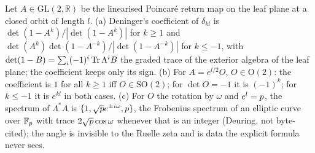 \begin{proposition}
\label{prop:deninger-local-coefficient}
Let $A\in\mathrm{GL}(2,\mathbb R)$ be the linearised Poincar\'e return map on the leaf plane at a closed orbit of
length $l$. (a) Deninger's coefficient of $\delta_{kl}$ is $\det(1-A^k)/|\det(1-A^k)|$ for $k\ge1$ and
$\det(A^k)\det(1-A^{-k})/|\det(1-A^{-k})|$ for $k\le-1$, with $\det(1-B) = \sum_i(-1)^i\operatorname{Tr}\Lambda^iB$ the graded trace %
of the exterior algebra of the leaf plane; the coefficient keeps only its sign. (b) For $A = e^{l/2}O$, $O\in\mathrm O(2)$:
the coefficient is $1$ for all $k\ge1$ iff $O\in\mathrm{SO}(2)$; for $\det O = -1$ it is $(-1)^k$; for $k\le-1$ it is
$e^{kl}$ in both cases. (c) For $O$ the rotation by $\omega$ and $e^l = p$, the spectrum of $\Lambda^*A$ is %
$\{1,\sqrt{p} e^{\pm i\omega},p\}$, the Frobenius spectrum of an elliptic curve over $\mathbb F_p$ with trace
$2\sqrt{p}\cos\omega$ whenever that is an integer (Deuring, not byte-cited); the angle is invisible to the Ruelle
zeta and is data the explicit formula never sees.
\end{proposition}

